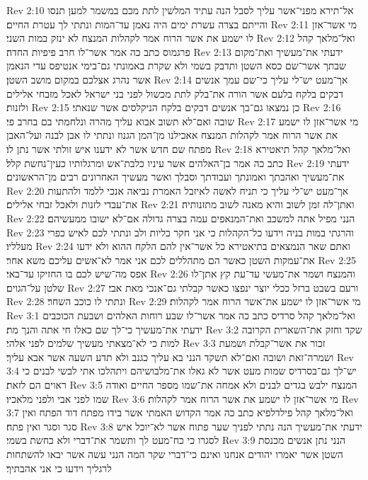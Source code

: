 Rev 2:10  אל־תירא מפני־אשר עליך לסבל הנה עתיד המלשין לתת מכם במשמר למען תנסו והייתם בצרה עשרת ימים היה נאמן עד־המות ונתתי לך עטרת החיים׃
Rev 2:11  מי אשר־אזן לו ישמע את אשר הרוח אמר לקהלות המנצח לא ינזק במות השני׃
Rev 2:12  ואל־מלאך קהל פרגמוס כתב כה אמר אשר־לו חרב פיפיות החדה׃
Rev 2:13  ידעתי את־מעשיך ואת־מקום שבתך אשר־שם כסא השטן ותדבק בשמי ולא שקרת באמונתי גם־בימי אנטיפס עדי הנאמן אשר נהרג אצלכם במקום מושב השטן׃
Rev 2:14  אך־מעט יש־לי עליך כי־שם עמך אנשים דבקים בלקח בלעם אשר הורה את־בלק לתת מכשול לפני בני ישראל לאכל מזבחי אלילים ולזנות׃
Rev 2:15  כן נמצאו גם־בך אנשים דבקים בלקח הניקלסים אשר שנאתי׃
Rev 2:16  שובה ואם־לא תשוב אבוא עליך מהרה ונלחמתי בם בחרב פי׃
Rev 2:17  מי אשר־אזן לו ישמע את אשר הרוח אמר לקהלות המנצח אאכילנו מן־המן הגנוז ונתתי לו אבן לבנה ועל־האבן מפתח שם חדש אשר לא ידענו איש זולתי אשר נתן לו׃
Rev 2:18  ואל־מלאך קהל תיאטירא כתב כה אמר בן־האלהים אשר עיניו כלבת־אש ומרגלותיו כעין־נחשת קלל׃
Rev 2:19  ידעתי את־מעשיך ואהבתך ואמונתך ועבודתך וסבלך ואשר מעשיך האחרונים רבים מן־הראשונים׃
Rev 2:20  אך־מעט יש־לי עליך כי תניח לאשה לאיזבל האמרת נביאה אנכי ללמד ולהתעות את־עבדי לזנות ולאכל זבחי אלילים׃
Rev 2:21  ואתן־לה זמן לשוב והיא מאנה לשוב מתזנותיה׃
Rev 2:22  הנני מפיל אתה למשכב ואת־המנאפים עמה בצרה גדולה אם־לא ישובו ממעשיהם׃
Rev 2:23  והרגתי במות בניה וידעו כל־הקהלות כי אני חקר כליות ולב ונתתי לכם לאיש כפרי מעלליו׃
Rev 2:24  ואתם שאר הנמצאים בתיאטירא כל אשר־אין להם הלקח ההוא ולא ידעו את־עמקות השטן כאשר הם מתהללים לכם אני אמר לא־אשים עליכם משא אחר׃
Rev 2:25  אפס מה־שיש לכם בו החזיקו עד־באי׃
Rev 2:26  והמנצח ושמר את־מעשי עד־עת קץ אתן־לו שלטן על־הגוים׃
Rev 2:27  ורעם בשבט ברזל ככלי יוצר ינפצו כאשר קבלתי גם־אנכי מאת אבי׃
Rev 2:28  ונתתי לו כוכב השחר׃
Rev 2:29  מי אשר־אזן לו ישמע את־אשר הרוח אמר לקהלות׃
Rev 3:1  ואל־מלאך קהל סרדיס כתב כה אמר אשר־לו שבע רוחות האלהים ושבעת הכוכבים ידעתי את־מעשיך כי־לך שם כאלו חי אתה והנך מת׃
Rev 3:2  שקד וחזק את־השארית הקרובה למות כי לא־מצאתי מעשיך שלמים לפני אלהי׃
Rev 3:3  זכור את אשר־קבלת ושמעת ושמרה־זאת ושובה ואם־לא תשקד הנני בא עליך כגנב ולא תדע השעה אשר אבא עליך׃
Rev 3:4  יש־לך גם־בסרדיס שמות מעט אשר לא גאלו את־מלבושיהם ויתהלכו אתי לבשי לבנים כי ראוים הם לזאת׃
Rev 3:5  המנצח ילבש בגדים לבנים ולא אמחה את־שמו מספר החיים ואודה שמו לפני אבי ולפני מלאכיו׃
Rev 3:6  מי אשר־אזן לו ישמע את אשר הרוח אמר לקהלות׃
Rev 3:7  ואל־מלאך קהל פילדלפיא כתב כה אמר הקדוש האמתי אשר בידו מפתח דוד הפתח ואין סגר וסגר ואין פתח׃
Rev 3:8  ידעתי את־מעשיך הנה נתתי לפניך שער פתוח אשר לא־יוכל איש לסגרו כי כח־מעט לך ותשמר את־דברי ולא כחשת בשמי׃
Rev 3:9  הנני נתן אנשים מכנסת השטן אשר יאמרו יהודים אנחנו ואינם כי־דברי שקר המה הנני עשה אשר יבאו להשתחות לרגליך וידעו כי אני אהבתיך׃
